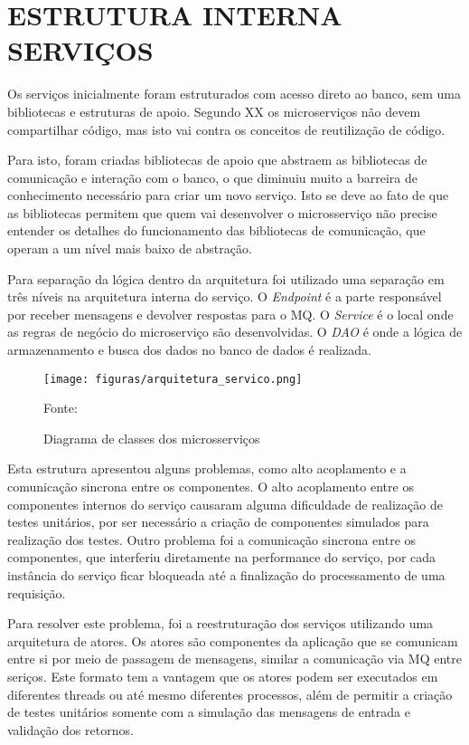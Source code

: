 \section{ESTRUTURA INTERNA SERVIÇOS}

Os serviços inicialmente foram estruturados com acesso direto ao banco, sem uma
bibliotecas e estruturas de apoio. Segundo XX os microserviços não devem
compartilhar código, mas isto vai contra os conceitos de reutilização de
código.

Para isto, foram criadas bibliotecas de apoio que abstraem as bibliotecas
de comunicação e interação com o banco, o que diminuiu muito a barreira
de conhecimento necessário para criar um novo serviço. Isto se deve ao
fato de que as bibliotecas permitem que quem vai desenvolver o
microsserviço não precise entender os detalhes do funcionamento das
bibliotecas de comunicação, que operam a um nível mais baixo de abstração.

Para separação da lógica dentro da arquitetura foi utilizado uma separação
em três níveis na arquitetura interna do serviço. O \emph{Endpoint} é a
parte responsável por receber mensagens e devolver respostas para o \ac{MQ}.
O \emph{Service} é o local onde as regras de negócio do microserviço são
desenvolvidas. O \emph{DAO} é onde a lógica de armazenamento e busca dos
dados no banco de dados é realizada.

\begin{figure}[H]
	\centering
	\caption{Diagrama de classes dos microsserviços}
	\texttt{[image: figuras/arquitetura\_servico.png]}

	\label{fig:arch-servico}
	\footnotesize Fonte: \fonteOAutor
\end{figure}

Esta estrutura apresentou alguns problemas, como alto acoplamento e a
comunicação sincrona entre os componentes. O alto acoplamento entre
os componentes internos do serviço causaram alguma dificuldade de
realização de testes unitários, por ser necessário a criação de
componentes simulados para realização dos testes. Outro problema foi a
comunicação sincrona entre os componentes, que interferiu diretamente
na performance do serviço, por cada instância do serviço ficar bloqueada
até a finalização do processamento de uma requisição.

Para resolver este problema, foi a reestruturação dos serviços utilizando
uma arquitetura de atores. Os atores são componentes da aplicação que se
comunicam entre si por meio de passagem de mensagens, similar a comunicação
via \ac{MQ} entre seriços. Este formato tem a vantagem que os atores podem
ser executados em diferentes threads ou até mesmo diferentes processos,
além de permitir a criação de testes unitários somente com a simulação das
mensagens de entrada e validação dos retornos.

